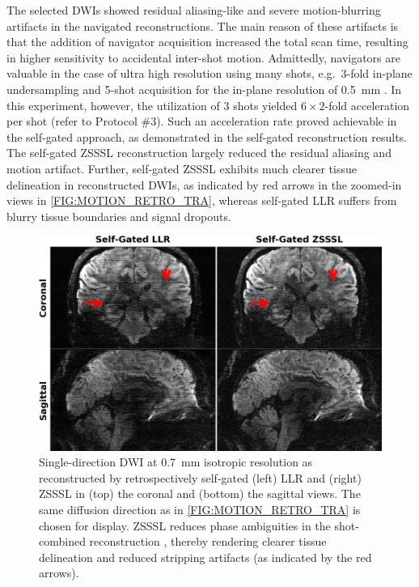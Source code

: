 \documentclass[journal,twoside,web]{ieeecolor}
\begin{document}
	The selected DWIs showed residual aliasing-like and
	severe motion-blurring artifacts
	in the navigated reconstructions.
	The main reason of these artifacts is that
	the addition of navigator acquisition
	increased the total scan time,
	resulting in higher sensitivity to accidental inter-shot motion.
	Admittedly, navigators are valuable in the case of ultra high resolution
	using many shots, e.g.~3-fold in-plane undersampling and 5-shot acquisition
	for the in-plane resolution of 0.5~mm \cite{tan_2024_naviepi}.
	In this experiment, however, the utilization of 3 shots yielded
	$6 \times 2$-fold acceleration per shot (refer to Protocol \#3).
	Such an acceleration rate proved achievable in the self-gated approach,
	as demonstrated in the self-gated reconstruction results.
	The self-gated ZSSSL reconstruction largely reduced the residual aliasing
	and motion artifact.
	Further, self-gated ZSSSL exhibits much clearer tissue delineation
	in reconstructed DWIs, as indicated by red arrows in the zoomed-in views
	in \cref{FIG:MOTION_RETRO_TRA},
	whereas self-gated LLR suffers from
	blurry tissue boundaries and signal dropouts.

	\begin{figure}
		\begin{minipage}[c]{0.75\textwidth}
			\includegraphics[width=\textwidth]{../figures/fig3.png}
		\end{minipage}\hfill
		\begin{minipage}[c]{0.23\textwidth}
			\caption{Single-direction DWI at 0.7~mm isotropic resolution
				as reconstructed by retrospectively self-gated
				(left) LLR and (right) ZSSSL
				in (top) the coronal and (bottom) the sagittal views.
				The same diffusion direction as in \cref{FIG:MOTION_RETRO_TRA}
				is chosen for display.
				ZSSSL reduces phase ambiguities in the shot-combined reconstruction
				, thereby rendering clearer tissue delineation and
				reduced stripping artifacts (as indicated by the red arrows).}
			\label{FIG:MOTION_RETRO_2}
		\end{minipage}
	\end{figure}
\end{document}

